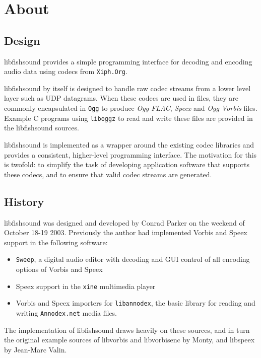 \section{About}
\label{group__about}
\subsection{Design}\label{group__about_design}
libfishsound provides a simple programming interface for decoding and encoding audio data using codecs from {\tt Xiph.Org}.

libfishsound by itself is designed to handle raw codec streams from a lower level layer such as UDP datagrams. When these codecs are used in files, they are commonly encapsulated in {\tt Ogg} to produce {\em Ogg FLAC\/}, {\em Speex\/} and {\em Ogg Vorbis\/} files. Example C programs using {\tt liboggz} to read and write these files are provided in the libfishsound sources.

libfishsound is implemented as a wrapper around the existing codec libraries and provides a consistent, higher-level programming interface. The motivation for this is twofold: to simplify the task of developing application software that supports these codecs, and to ensure that valid codec streams are generated.\subsection{History}\label{group__about_history}
libfishsound was designed and developed by Conrad Parker on the weekend of October 18-19 2003. Previously the author had implemented Vorbis and Speex support in the following software:\begin{itemize}
\item {\tt Sweep}, a digital audio editor with decoding and GUI control of all encoding options of Vorbis and Speex\item Speex support in the {\tt xine} multimedia player\item Vorbis and Speex importers for {\tt libannodex}, the basic library for reading and writing {\tt Annodex.net} media files.\end{itemize}


The implementation of libfishsound draws heavily on these sources, and in turn the original example sources of libvorbis and libvorbisenc by Monty, and libspeex by Jean-Marc Valin.

